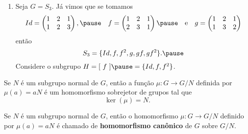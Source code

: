 \documentclass{beamer}
\begin{document}
    \begin{frame}
        \begin{exemplos}
            \begin{enumerate}[label=({\arabic*})]
                \conti
                
                \item Seja $G = S_3$. \pause Já vimos que se tomamos
                \[
                    Id = \begin{pmatrix}
                        1 & 2 & 1\\
                        1 & 2 & 3
                    \end{pmatrix}, \pause\quad
                    f = \begin{pmatrix}
                        1 & 2 & 1\\
                        2 & 3 & 1
                    \end{pmatrix} \pause \quad \mbox{e}\quad
                    g = \begin{pmatrix}
                        1 & 2 & 1\\
                        1 & 3 & 2
                    \end{pmatrix}
                \]
                então
                \[
                    S_3 = \{Id, f, f^2, g, gf, gf^2\}. \pause
                \]
                Considere o subgrupo $H = [\ f\ ] \pause = \{Id, f, f^2\}$.

                \seti
            \end{enumerate}
        \end{exemplos}
    \end{frame}

    \begin{frame}
        \begin{proposicao}
            Se $N$ é um subgrupo normal de $G$, \pause então a função $\mu : G \to G/N$ \pause definida por $\mu(a) = aN$ \pause é um homomorfismo sobrejetor \pause de grupos tal que \pause
            \[
                \ker(\mu) = N.
            \]
        \end{proposicao}
    \end{frame}

    \begin{frame}
        \begin{definicao}
            Se $N$ é um subgrupo normal de $G$, \pause então o homomorfismo $\mu : G \to G/N$ \pause definido por $\mu(a) = aN$ \pause é chamado de \textbf{homomorfismo canônico} \pause de $G$ sobre $G/N$.
        \end{definicao}
    \end{frame}
\end{document}
